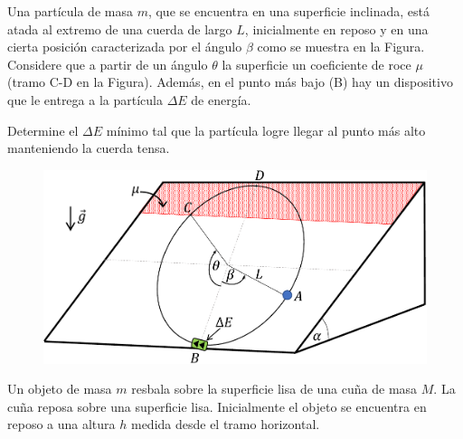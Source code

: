 \documentclass[letterpaper,11pt]{article}
\begin{document}
\vspace{-1cm}
\begin{enumerate}\setlength{\itemsep}{0.4cm}

\item[]

\item \vspace{1em}
\begin{minipage}{0.55\linewidth}
    \item Una partícula de masa $m$, que se encuentra en una superficie inclinada, está atada al extremo de una cuerda de largo $L$, inicialmente en reposo y en una cierta posición caracterizada por el ángulo $\beta$ como se muestra en la Figura. Considere que a partir de un ángulo $\theta$ la superficie un coeficiente de roce $\mu$ (tramo C-D en la Figura). Además, en el punto más bajo (B) hay un dispositivo que le entrega a la partícula $\Delta E$ de energía.

    Determine el $\Delta E$ mínimo tal que la partícula logre llegar al punto más alto manteniendo la cuerda tensa. 
\end{minipage}
\hfill
\begin{minipage}{0.4\linewidth}
    \begin{figure}[H]
        \centering
        \includegraphics[width=1\linewidth]{2023-1/img/TD 4/p2c2.pdf}
    \end{figure}
\end{minipage}

\item Un objeto de masa $m$ resbala sobre la superficie lisa de una cuña de masa $M$. La cuña reposa sobre una superficie lisa. Inicialmente el objeto se encuentra en reposo a una altura $h$ medida desde el tramo horizontal.

\begin{multicols}{2}
    

\end{multicols}
\end{enumerate}
\end{document}
